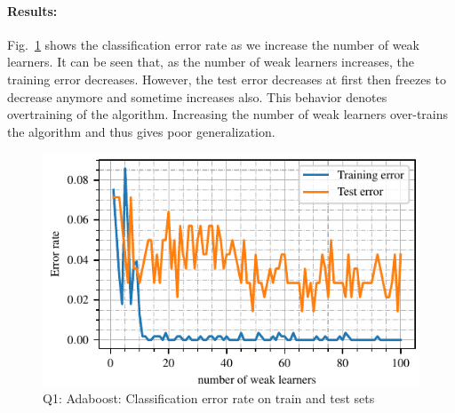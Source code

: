 \paragraph{Results:}Fig.~\ref{fig:q1_error_rate} shows the classification error rate as we increase the number of weak learners. It can be seen that, as the number of weak learners increases, the training error decreases. However, the test error decreases at first then freezes to decrease anymore and sometime increases also. This behavior denotes overtraining of the algorithm. Increasing the number of weak learners over-trains the algorithm and thus gives poor generalization. 
\begin{figure}[!h]
	\centering
	\includegraphics[scale=1.0,trim={0cm 0cm 0cm 0cm},clip]{./code/generatedPlots/q1_error_rate.pdf}
	\caption{Q1: Adaboost: Classification error rate on train and test sets}
	\label{fig:q1_error_rate}
\end{figure}